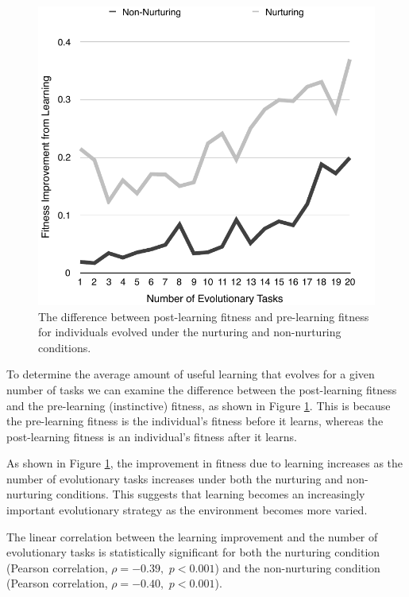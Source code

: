 \documentclass[master]{outhesis}
\begin{document}
\begin{figure}[h]
	\centering
	\includegraphics{LearningImprovementPlot.pdf}
	\caption{The difference between post-learning fitness and pre-learning fitness for individuals evolved under the nurturing and non-nurturing conditions.}
	\label{fig:LearningImprovement}
\end{figure}

To determine the average amount of useful learning that evolves for a given number of tasks we can examine the difference between the post-learning fitness and the pre-learning (instinctive) fitness, as shown in Figure \ref{fig:LearningImprovement}.
This is because the pre-learning fitness is the individual's fitness before it learns, whereas the post-learning fitness is an individual's fitness after it learns.

As shown in Figure \ref{fig:LearningImprovement},
the improvement in fitness due to learning increases as the number of evolutionary tasks increases under both the nurturing and non-nurturing conditions.
This suggests that learning becomes an increasingly important evolutionary strategy as the environment becomes more varied.

The linear correlation between the learning improvement and the number of evolutionary tasks is statistically significant for both
the nurturing condition (Pearson correlation, $\rho=-0.39,$ $p < 0.001$)
and the non-nurturing condition (Pearson correlation, $\rho=-0.40,$ $p < 0.001$). 
\end{document}
